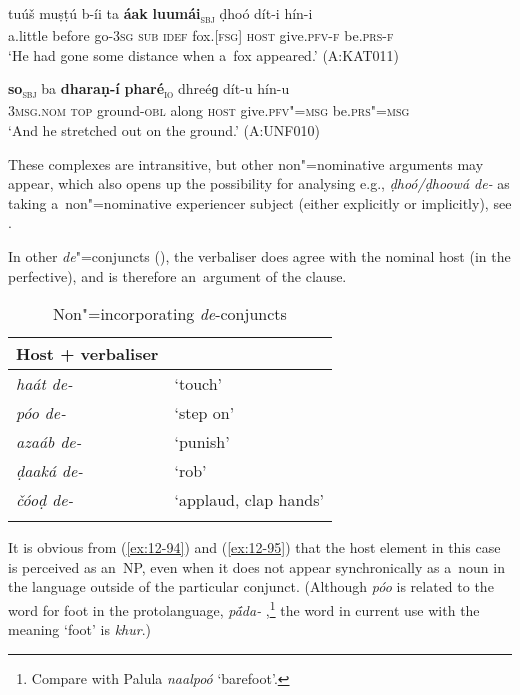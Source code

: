 \begin{exe}
\ex
\label{ex:12-92}
\gll tuúš muṣṭú b-íi ta {\ob}\textbf{áak} \textbf{luumái}{\cb}\textsubscript{\textsc{\upshape sbj}} ḍhoó dít-i hín-i\\
a.little before go-\textsc{3sg} \textsc{sub} \textsc{idef} fox.[\textsc{fsg]} \textsc{host} give.\textsc{pfv-f} be.\textsc{prs-f}\\
\glt `He had gone some distance when a~fox appeared.' (A:KAT011)
\end{exe}
\begin{exe}
\ex
\label{ex:12-93}
\gll {\ob}\textbf{so}{\cb}\textsubscript{\textsc{\upshape sbj}} ba {\ob}\textbf{dharaṇ-í} \textbf{pharé}{\cb}\textsubscript{\textsc{\upshape io}} dhreéɡ dít-u hín-u\\
\textsc{3msg.nom} \textsc{top} ground-\textsc{obl} along \textsc{host} give.\textsc{pfv"=msg} be.\textsc{prs"=msg}\\
\glt `And he stretched out on the ground.' (A:UNF010)
\end{exe}

These complexes are intransitive, but other non"=nominative arguments may appear, which also opens up the possibility for analysing e.g., \textit{ḍhoó/ḍhoowá de-} as taking a~non"=nominative experiencer subject (either explicitly or implicitly), see . 


 In other \textit{de}"=conjuncts (), the verbaliser does agree with the nominal host (in the perfective), and is therefore an~argument of the clause. 


\begin{table}[ht]
\caption{Non"=incorporating \textit{de}-conjuncts}
\begin{tabularx}{.75\textwidth}{ l@{\hspace{45pt}} Q }
\lspbottomrule
\textbf{Host + verbaliser} &
\\\hline
\textit{haát de-} &
`touch'\\
\textit{póo de-} &
`step on'\\
\textit{azaáb de-} &
`punish'\\
\textit{ḍaaká de-} &
`rob'\\
\textit{čóoḍ de-} &
`applaud, clap hands'\\\lspbottomrule
\end{tabularx}
\label{tab:12-8}
\end{table}


It is obvious from (\ref{ex:12-94}) and (\ref{ex:12-95}) that the host element in this case is
perceived as an~NP, even when it does not appear synchronically as a~noun in the language outside of
the particular conjunct. (Although \textit{póo} is related to the word for foot in the protolanguage, \textit{p\'{\={a}}da-} \citep[8056]{turner1966},\footnote{Compare with Palula \textit{naalpoó} `barefoot'.} the word in current use with the meaning `foot' is
\textit{khur}.)

